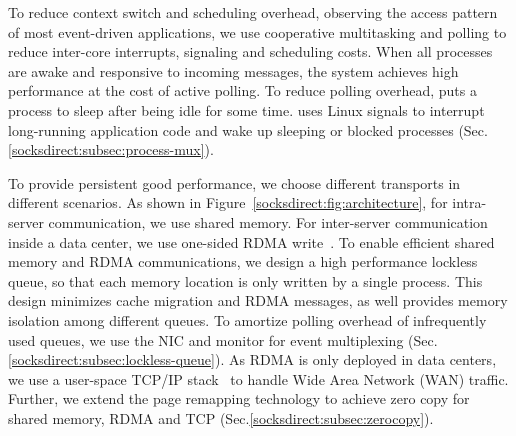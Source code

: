 To reduce context switch and scheduling overhead, observing the access pattern of most event-driven applications, we use cooperative multitasking and polling to reduce inter-core interrupts, signaling and scheduling costs. When all processes are awake and responsive to incoming messages, the system achieves high performance at the cost of active polling. To reduce polling overhead, \sys puts a process to sleep after being idle for some time. \sys uses Linux signals to interrupt long-running application code and wake up sleeping or blocked processes (Sec.\ref{socksdirect:subsec:process-mux}). 

 To provide persistent good performance, we choose different transports in different scenarios. As shown in Figure~\ref{socksdirect:fig:architecture}, for intra-server communication, we use shared memory. For inter-server communication inside a data center, we use one-sided RDMA write~\cite{mitchell2013using,kaminsky2016design}. To enable efficient shared memory and RDMA communications, we design a high performance lockless queue, so that each memory location is only written by a single process. This design minimizes cache migration and RDMA messages, as well provides memory isolation among different queues. To amortize polling overhead of infrequently used queues, we use the NIC and monitor for event multiplexing (Sec.\ref{socksdirect:subsec:lockless-queue}). As RDMA is only deployed in data centers, we use a user-space TCP/IP stack~\cite{dunkels2001design} to handle Wide Area Network (WAN) traffic. Further, we extend the page remapping technology to achieve zero copy for shared memory, RDMA and TCP (Sec.\ref{socksdirect:subsec:zerocopy}).
